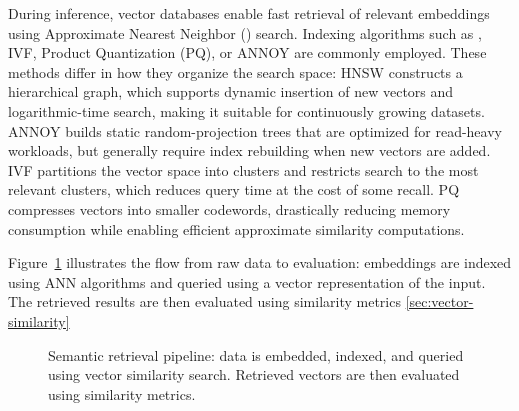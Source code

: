 During inference, vector databases enable fast retrieval of relevant embeddings using Approximate Nearest Neighbor () search. 
Indexing algorithms such as , \gls{IVF}, Product Quantization (PQ), or \gls{ANNOY} are commonly employed. 
These methods differ in how they organize the search space: 
\gls{HNSW} constructs a hierarchical graph, which supports dynamic insertion of new vectors and logarithmic-time search, making it suitable for continuously growing datasets. 
\gls{ANNOY} builds static random-projection trees that are optimized for read-heavy workloads, but generally require index rebuilding when new vectors are added. 
\gls{IVF} partitions the vector space into clusters and restricts search to the most relevant clusters, which reduces query time at the cost of some recall. 
PQ compresses vectors into smaller codewords, drastically reducing memory consumption while enabling efficient approximate similarity computations. 

Figure~\ref{fig:semantic-search-pipeline} illustrates the flow from raw data to evaluation: embeddings are indexed using \gls{ANN} algorithms and queried using a vector representation of the input. The retrieved results are then evaluated using similarity metrics \ref{sec:vector-similarity}
\begin{figure}[H]
    \centering
    \caption{Semantic retrieval pipeline: data is embedded, indexed, and queried using vector similarity search. Retrieved vectors are then evaluated using similarity metrics.}\label{fig:semantic-search-pipeline}
\end{figure}

